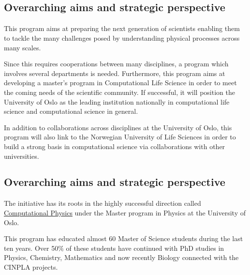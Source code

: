 \documentclass[%
twoside,                 %
final,                   %
10pt]{article}
\begin{document}
\subsection*{Overarching aims and strategic perspective}

\paragraph{}

This program aims  at preparing the next generation of scientists enabling them to tackle the many challenges posed by understanding physical processes across many scales. 

Since this requires cooperations between many disciplines, a program
which involves several departments is needed. Furthermore, this
program aims at developing a master's program in Computational Life
Science in order to meet the coming needs of the scientific community. If successful, it will
position the University of Oslo as the leading institution
nationally in computational life science and computational science in general. 

In addition to collaborations across disciplines at the University of Oslo, 
this program will also link to the Norwegian University of Life Sciences 
in order to build a strong basis in computational science via collaborations with other universities.




\subsection*{Overarching aims and strategic perspective}

\paragraph{}

The initiative has its roots in the highly successful direction called \href{{http://www.uio.no/english/studies/programmes/physics-master/programme-options/computational/index.html}}{Computational Physics}
under the Master program in Physics at the University of Oslo.

This program has educated almost 60 Master of Science students during the last ten years.
Over 50\% of these students have continued with PhD studies in Physics, Chemistry, Mathematics and
now recently Biology connected with the CINPLA projects. 
\end{document}

